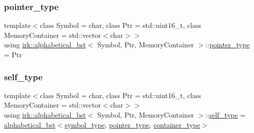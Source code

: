 \mbox{\label{classirk_1_1alphabetical__bst_ae689c05ab96a71769e24908d5c73765c}} 
\subsubsection{\texorpdfstring{pointer\+\_\+type}{pointer\_type}}
{\footnotesize\ttfamily template$<$class Symbol = char, class Ptr = std\+::uint16\+\_\+t, class Memory\+Container = std\+::vector$<$char$>$$>$ \\
using \mbox{\hyperlink{classirk_1_1alphabetical__bst}{irk\+::alphabetical\+\_\+bst}}$<$ Symbol, Ptr, Memory\+Container $>$\+::\mbox{\hyperlink{classirk_1_1alphabetical__bst_ae689c05ab96a71769e24908d5c73765c}{pointer\+\_\+type}} =  Ptr}

\mbox{\label{classirk_1_1alphabetical__bst_ad7af88cf8e49989f7c5521dd08580a9a}} 
\subsubsection{\texorpdfstring{self\+\_\+type}{self\_type}}
{\footnotesize\ttfamily template$<$class Symbol = char, class Ptr = std\+::uint16\+\_\+t, class Memory\+Container = std\+::vector$<$char$>$$>$ \\
using \mbox{\hyperlink{classirk_1_1alphabetical__bst}{irk\+::alphabetical\+\_\+bst}}$<$ Symbol, Ptr, Memory\+Container $>$\+::\mbox{\hyperlink{classirk_1_1alphabetical__bst_ad7af88cf8e49989f7c5521dd08580a9a}{self\+\_\+type}} =  \mbox{\hyperlink{classirk_1_1alphabetical__bst}{alphabetical\+\_\+bst}}$<$\mbox{\hyperlink{classirk_1_1alphabetical__bst_a296ccb8fa9fa9dce3b3c3beab0a5ca28}{symbol\+\_\+type}}, \mbox{\hyperlink{classirk_1_1alphabetical__bst_ae689c05ab96a71769e24908d5c73765c}{pointer\+\_\+type}}, \mbox{\hyperlink{classirk_1_1alphabetical__bst_aeed9efc6a48ff6d504a608e06223f386}{container\+\_\+type}}$>$}

\mbox{\label{classirk_1_1alphabetical__bst_a296ccb8fa9fa9dce3b3c3beab0a5ca28}} 
